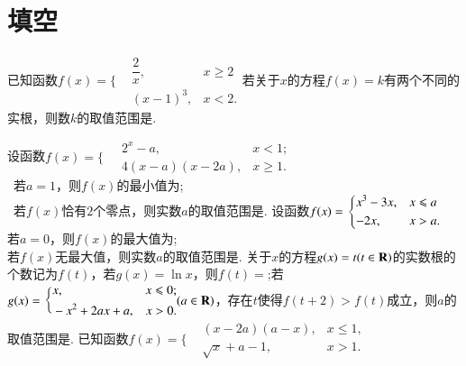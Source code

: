 \documentclass{BHCexam}
\begin{document}
\vspace{4em}
\section{填空}
\begin{questions}
\qs 已知函数$f(x)=\Bigg\{\begin{aligned}
&\dfrac{2}{x},&x\ge2\\
&(x-1)^3,&x<2.
\end{aligned}$若关于$ x $的方程$ f(x)=k $有两个不同的实根，则数$ k $的取值范围是\tk.

\qs
设函数$f(x)=\Bigg\{\begin{aligned}
&~2^x-a,& x<1;\\
&~4(x-a)(x-2a),& x\ge 1.
\end{aligned}$\\
~若$a=1$，则$ f(x) $的最小值为\tk;\\
~若$f(x) $恰有$ 2 $个零点，则实数$ a $的取值范围是\tk.
\qs 设函数$f(x)=\begin{dcases}
x^3-3x,&x\le a \\
-2x,&x>a.
\end{dcases}$\\
 若$ a=0 $，则$f(x)$的最大值为\tk;\\
 若$f(x)$无最大值，则实数$ a $的取值范围是\tk.
\qs 关于$ x $的方程$ g(x)=t(t\inR) $的实数根的个数记为$ f(t) $，若$g(x)=\ln x$，则$f(t)=$\tk;若$g(x)=\Bigg\{\begin{aligned}
&x,&x\le0;\\
&-x^2+2ax+a,&x>0.
\end{aligned}(a\inR)$，存在$ t $使得$ f(t+2)>f(t) $成立，则$ a $的取值范围是\tk.
\qs 已知函数$f(x)=\Bigg\{\begin{aligned}
&(x-2a)(a-x),&x\le 1,\\&\sqrt{x}+a-1,&x>1.
\end{aligned}$
\end{questions}
\end{document}
